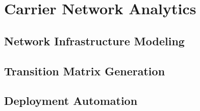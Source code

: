 
\section{Carrier Network Analytics}\label{subsec:contribs:main}


\subsection{Network Infrastructure Modeling}\label{subsec:contribs:modeling}


\subsection{Transition Matrix Generation}\label{subsec:contribs:trans}


\subsection{Deployment Automation}\label{subsec:contribs:deploy}
